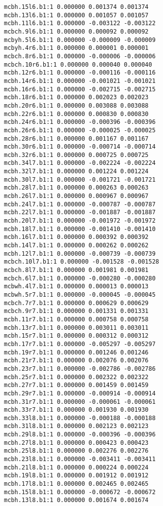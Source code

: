 \begin{verbatim}
mcbh.15l6.b1:1 0.000000 0.001374 0.001374
mcbh.13l6.b1:1 0.000000 0.001057 0.001057
mcbh.11l6.b1:1 0.000000 -0.003122 -0.003122
mcbch.9l6.b1:1 0.000000 0.000092 0.000092
mcbyh.5l6.b1:1 0.000000 -0.000009 -0.000009
mcbyh.4r6.b1:1 0.000000 0.000001 0.000001
mcbch.8r6.b1:1 0.000000 -0.000006 -0.000006
mcbch.10r6.b1:1 0.000000 0.000040 0.000040
mcbh.12r6.b1:1 0.000000 -0.000116 -0.000116
mcbh.14r6.b1:1 0.000000 -0.001021 -0.001021
mcbh.16r6.b1:1 0.000000 -0.002715 -0.002715
mcbh.18r6.b1:1 0.000000 0.002023 0.002023
mcbh.20r6.b1:1 0.000000 0.003088 0.003088
mcbh.22r6.b1:1 0.000000 0.000830 0.000830
mcbh.24r6.b1:1 0.000000 -0.000396 -0.000396
mcbh.26r6.b1:1 0.000000 -0.000025 -0.000025
mcbh.28r6.b1:1 0.000000 0.001167 0.001167
mcbh.30r6.b1:1 0.000000 -0.000714 -0.000714
mcbh.32r6.b1:1 0.000000 0.000725 0.000725
mcbh.34l7.b1:1 0.000000 -0.002224 -0.002224
mcbh.32l7.b1:1 0.000000 0.001224 0.001224
mcbh.30l7.b1:1 0.000000 -0.001721 -0.001721
mcbh.28l7.b1:1 0.000000 0.000263 0.000263
mcbh.26l7.b1:1 0.000000 0.000967 0.000967
mcbh.24l7.b1:1 0.000000 -0.000787 -0.000787
mcbh.22l7.b1:1 0.000000 -0.001887 -0.001887
mcbh.20l7.b1:1 0.000000 -0.001972 -0.001972
mcbh.18l7.b1:1 0.000000 -0.001410 -0.001410
mcbh.16l7.b1:1 0.000000 0.000392 0.000392
mcbh.14l7.b1:1 0.000000 0.000262 0.000262
mcbh.12l7.b1:1 0.000000 -0.000739 -0.000739
mcbch.10l7.b1:1 0.000000 -0.001528 -0.001528
mcbch.8l7.b1:1 0.000000 0.001981 0.001981
mcbch.6l7.b1:1 0.000000 -0.000280 -0.000280
mcbwh.4l7.b1:1 0.000000 0.000013 0.000013
mcbwh.5r7.b1:1 0.000000 -0.000045 -0.000045
mcbch.7r7.b1:1 0.000000 0.000629 0.000629
mcbch.9r7.b1:1 0.000000 0.001331 0.001331
mcbh.11r7.b1:1 0.000000 0.000758 0.000758
mcbh.13r7.b1:1 0.000000 0.003011 0.003011
mcbh.15r7.b1:1 0.000000 0.000312 0.000312
mcbh.17r7.b1:1 0.000000 -0.005297 -0.005297
mcbh.19r7.b1:1 0.000000 0.001246 0.001246
mcbh.21r7.b1:1 0.000000 0.002076 0.002076
mcbh.23r7.b1:1 0.000000 -0.002786 -0.002786
mcbh.25r7.b1:1 0.000000 0.002322 0.002322
mcbh.27r7.b1:1 0.000000 0.001459 0.001459
mcbh.29r7.b1:1 0.000000 -0.000914 -0.000914
mcbh.31r7.b1:1 0.000000 -0.000061 -0.000061
mcbh.33r7.b1:1 0.000000 0.001930 0.001930
mcbh.33l8.b1:1 0.000000 -0.000188 -0.000188
mcbh.31l8.b1:1 0.000000 0.002123 0.002123
mcbh.29l8.b1:1 0.000000 -0.000396 -0.000396
mcbh.27l8.b1:1 0.000000 0.000423 0.000423
mcbh.25l8.b1:1 0.000000 0.002276 0.002276
mcbh.23l8.b1:1 0.000000 -0.003411 -0.003411
mcbh.21l8.b1:1 0.000000 0.000224 0.000224
mcbh.19l8.b1:1 0.000000 0.001912 0.001912
mcbh.17l8.b1:1 0.000000 0.002465 0.002465
mcbh.15l8.b1:1 0.000000 -0.000672 -0.000672
mcbh.13l8.b1:1 0.000000 0.001674 0.001674

\end{verbatim}
